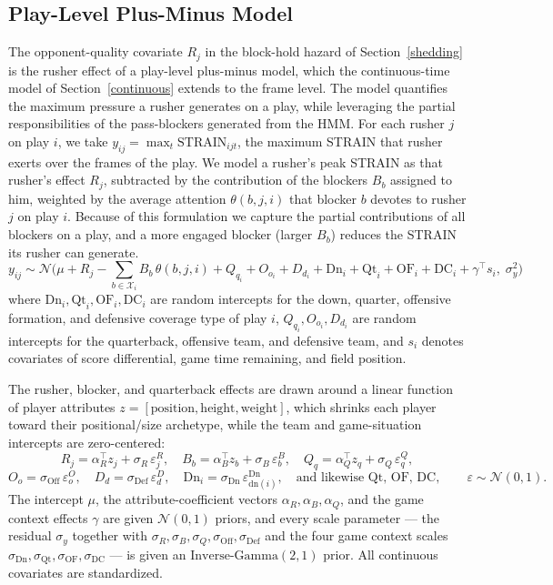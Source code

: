 \documentclass[USenglish]{article}
\theoremstyle{dgthm}
\theoremstyle{dgdef}
\begin{document}
\begin{appendices}
% 




\FloatBarrier
\section{Play-Level Plus-Minus Model} \label{sec:playlevel}
The opponent-quality covariate $R_j$ in the block-hold hazard of Section~\ref{shedding} is the rusher effect of a play-level plus-minus model, which the continuous-time model of Section~\ref{continuous} extends to the frame level. The model quantifies the maximum pressure a rusher generates on a play, while leveraging the partial responsibilities of the pass-blockers generated from the HMM. For each rusher $j$ on play $i$, we take $y_{ij} = \max_t \text{STRAIN}_{ijt}$, the maximum STRAIN that rusher exerts over the frames of the play. We model a rusher's peak STRAIN as that rusher's effect $R_j$, subtracted by the contribution of the blockers $B_b$ assigned to him, weighted by the average attention $\theta(b,j,i)$ that blocker $b$ devotes to rusher $j$ on play $i$. Because of this formulation we capture the partial contributions of all blockers on a play, and a more engaged blocker (larger $B_b$) reduces the STRAIN its rusher can generate.
$$ y_{ij} \sim \mathcal{N}\Big( \mu + R_{j} - \!\!\sum_{b \in \mathcal{X}_i}\!\! B_{b}\,\theta(b, j, i) + Q_{q_i} + O_{o_i} + D_{d_i} + \mathrm{Dn}_{i} + \mathrm{Qt}_{i} + \mathrm{OF}_{i} + \mathrm{DC}_{i} + \gamma^\top s_i , \; \sigma_y^2 \Big) $$
where $\mathrm{Dn}_i, \mathrm{Qt}_i, \mathrm{OF}_i, \mathrm{DC}_i$ are random intercepts for the down, quarter, offensive formation, and defensive coverage type of play $i$, $Q_{q_i}, O_{o_i}, D_{d_i}$ are random intercepts for the quarterback, offensive team, and defensive team, and $s_i$ denotes covariates of score differential, game time remaining, and field position.

The rusher, blocker, and quarterback effects are drawn around a linear function of player attributes $z = [\text{position}, \text{height}, \text{weight}]$, which shrinks each player toward their positional/size archetype, while the team and game-situation intercepts are zero-centered:
$$ R_j = \alpha_R^\top z_j + \sigma_R\,\varepsilon^R_j, \quad B_b = \alpha_B^\top z_b + \sigma_B\,\varepsilon^B_b, \quad Q_q = \alpha_Q^\top z_q + \sigma_Q\,\varepsilon^Q_q, $$
$$ O_o = \sigma_{\mathrm{Off}}\,\varepsilon^O_o,\quad D_d = \sigma_{\mathrm{Def}}\,\varepsilon^D_d,\quad \mathrm{Dn}_i = \sigma_{\mathrm{Dn}}\,\varepsilon^{\mathrm{Dn}}_{\mathrm{dn}(i)}, \quad\text{and likewise } \mathrm{Qt},\,\mathrm{OF},\,\mathrm{DC}, \qquad \varepsilon \sim \mathcal{N}(0,1). $$
The intercept $\mu$, the attribute-coefficient vectors $\alpha_R, \alpha_B, \alpha_Q$, and the game context effects $\gamma$ are given $\mathcal{N}(0,1)$ priors, and every scale parameter --- the residual $\sigma_y$ together with $\sigma_R, \sigma_B, \sigma_Q, \sigma_{\mathrm{Off}}, \sigma_{\mathrm{Def}}$ and the four game context scales $\sigma_{\mathrm{Dn}}, \sigma_{\mathrm{Qt}}, \sigma_{\mathrm{OF}}, \sigma_{\mathrm{DC}}$ --- is given an $\text{Inverse-Gamma}(2,1)$ prior. All continuous covariates are standardized.


\end{appendices}
\end{document}
